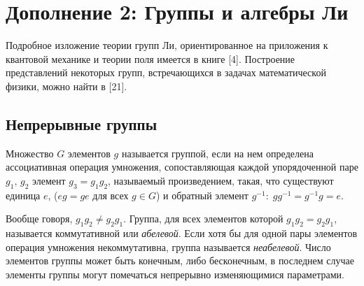 \documentclass[a4paper
]{article}
\begin{document}
\section{Дополнение 2: Группы и алгебры Ли}
Подробное изложение теории групп Ли, ориентированное на приложения
к квантовой механике и теории поля имеется в книге [4]. Построение
представлений некоторых групп, встречающихся в задачах
математической физики, можно найти в [21].
\subsection{Непрерывные группы}
\begin{Def}
Множество $G$ элементов $g$ называется группой, если на нем
определена ассоциативная операция умножения, сопоставляющая каждой
упорядоченной паре $g_1,\, g_2$ элемент $g_3= g_1 g_2$, называемый
произведением, такая, что существуют единица $e$, ($e g=g e$ для
всех $g\in G$) и обратный элемент $g^{-1}:\; gg^{-1}=g^{-1}g=e$.
\end{Def}
Вообще говоря, $g_1 g_2\neq g_2 g_1.$ Группа, для всех элементов
которой $g_1 g_2=g_2 g_1$, называется коммутативной или {\em
абелевой}. Если хотя бы для одной пары элементов операция
умножения некоммутативна, группа называется {\em неабелевой}.
Число элементов группы может быть конечным, либо бесконечным, в
последнем случае элементы группы могут помечаться непрерывно
изменяющимися параметрами.
\end{document}
